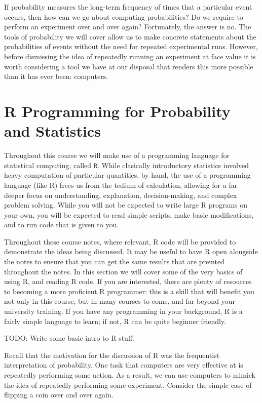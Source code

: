 \documentclass[
  letterpaper,
  DIV=11,
  numbers=noendperiod]{scrreprt}
\begin{document}
If probability measures the long-term frequency of times that a
particular event occurs, then how can we go about computing
probabilities? Do we require to perform an experiment over and over
again? Fortunately, the answer is no. The tools of probability we will
cover allow us to make concrete statements about the probabilities of
events without the need for repeated experimental runs. However, before
dismissing the idea of repeatedly running an experiment at face value it
is worth considering a tool we have at our disposal that renders this
more possible than it has ever been: computers.

\section{R Programming for Probability and
Statistics}\label{r-programming-for-probability-and-statistics}

Throughout this course we will make use of a programming language for
statistical computing, called \texttt{R}. While clasically introductory
statistics involved heavy computation of particular quantities, by hand,
the use of a programming language (like R) frees us from the tedium of
calculation, allowing for a far deeper focus on understanding,
explanation, decision-making, and complex problem solving. While you
will not be expected to write large R programs on your own, you will be
expected to read simple scripts, make basic modifications, and to run
code that is given to you.

Throughout these course notes, where relevant, R code will be provided
to demonstrate the ideas being discussed. It may be useful to have R
open alongside the notes to ensure that you can get the same results
that are preinted throughout the notes. In this section we will cover
some of the very basics of using R, and reading R code. If you are
interested, there are plenty of resources to becoming a more proficient
R programmer: this is a skill that will benefit you not only in this
course, but in many courses to come, and far beyond your university
training. If you have any programming in your background, R is a fairly
simple language to learn; if not, R can be quite beginner friendly.

TODO: Write some basic intro to R stuff.

Recall that the motivation for the discussion of R was the frequentist
interpretation of probability. One task that computers are very
effective at is repeatedly performing some action. As a result, we can
use computers to mimick the idea of repeatedly performing some
experiment. Consider the simple case of flipping a coin over and over
again.
\end{document}
